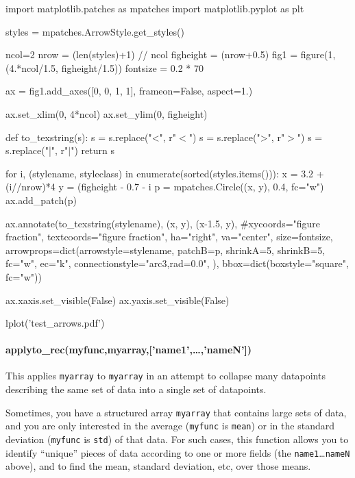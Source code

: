 \begin{python}
import matplotlib.patches as mpatches
import matplotlib.pyplot as plt

styles = mpatches.ArrowStyle.get_styles()

ncol=2
nrow = (len(styles)+1) // ncol
figheight = (nrow+0.5)
fig1 = figure(1, (4.*ncol/1.5, figheight/1.5))
fontsize = 0.2 * 70

ax = fig1.add_axes([0, 0, 1, 1], frameon=False, aspect=1.)

ax.set_xlim(0, 4*ncol)
ax.set_ylim(0, figheight)

def to_texstring(s):
    s = s.replace("<", r"$<$")
    s = s.replace(">", r"$>$")
    s = s.replace("|", r"$|$")
    return s

for i, (stylename, styleclass) in enumerate(sorted(styles.items())):
    x = 3.2 + (i//nrow)*4
    y = (figheight - 0.7 - i%
    p = mpatches.Circle((x, y), 0.4, fc="w")
    ax.add_patch(p)

    ax.annotate(to_texstring(stylename), (x, y),
                (x-1.5, y),
                #xycoords="figure fraction", textcoords="figure fraction",
                ha="right", va="center",
                size=fontsize,
                arrowprops=dict(arrowstyle=stylename,
                                patchB=p,
                                shrinkA=5,
                                shrinkB=5,
                                fc="w", ec="k",
                                connectionstyle="arc3,rad=0.0",
                                ),
                bbox=dict(boxstyle="square", fc="w"))

ax.xaxis.set_visible(False)
ax.yaxis.set_visible(False)

lplot('test_arrows.pdf')
\end{python}
\paragraph{applyto\_rec(myfunc,myarray,['name1',\ldots,'nameN'])}\label{codelabel:applyto_rec}
This applies \texttt{myarray} to \texttt{myarray} in an attempt
    to collapse many datapoints describing the same set of data
    into a single set of datapoints.

Sometimes, you have a structured array \texttt{myarray} that
    contains large sets of data,
    and you are only interested in the average
    (\texttt{myfunc} is \texttt{mean})
    or in the standard deviation
    (\texttt{myfunc} is \texttt{std})
    of that data.
For such cases, this function allows you to identify ``unique''
    pieces of data according to one or more fields
    (the \texttt{name1}\ldots\texttt{nameN} above),
    and to find the mean, standard deviation, etc,
    over those means.

